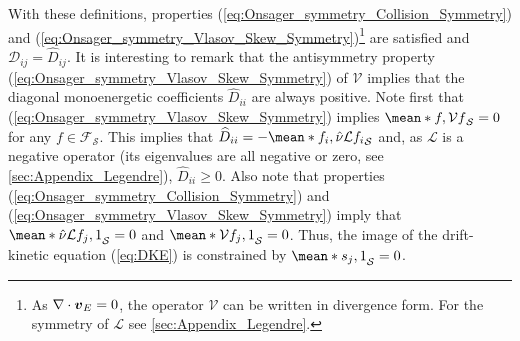 \documentclass[10pt]{iopart}
\newcommand{\Lorentz}{\mathcal{L}}
\begin{document}
With these definitions, properties (\ref{eq:Onsager_symmetry_Collision_Symmetry}) and (\ref{eq:Onsager_symmetry_Vlasov_Skew_Symmetry})\footnote{As $\nabla \cdot \vb*{v}_E =0$, the operator $\mathcal{V}$ can be written in divergence form. For the symmetry of $\Lorentz$ see \ref{sec:Appendix_Legendre}.} are satisfied and $\mathcal{D}_{ij} = \widehat{D}_{ij} $. It is interesting to remark that the antisymmetry property (\ref{eq:Onsager_symmetry_Vlasov_Skew_Symmetry}) of $\mathcal{V}$ implies that the diagonal monoenergetic coefficients $\widehat{D}_{ii} $ are always positive. Note first that (\ref{eq:Onsager_symmetry_Vlasov_Skew_Symmetry}) implies $\mean*{f, \mathcal{V} f}_{\mathcal{S}} = 0$ for any $f\in \mathcal{F}_{\mathcal{S}}$. This implies that $\widehat{D}_{ii} = - \mean*{f_i, \hat{\nu}\Lorentz f_i}_{\mathcal{S}} $ and, as $\Lorentz$ is a negative operator (its eigenvalues are all negative or zero, see \ref{sec:Appendix_Legendre}), $\widehat{D}_{ii} \ge 0$. Also note that properties (\ref{eq:Onsager_symmetry_Collision_Symmetry}) and (\ref{eq:Onsager_symmetry_Vlasov_Skew_Symmetry}) imply that $\mean*{\hat{\nu}\mathcal{L}f_j,1}_{\mathcal{S}} = 0$ and $\mean*{\mathcal{V}f_j,1}_{\mathcal{S}} = 0$. Thus, the image of the drift-kinetic equation (\ref{eq:DKE}) is constrained by $\mean*{s_j,1}_{\mathcal{S}} = 0$.
\end{document}
